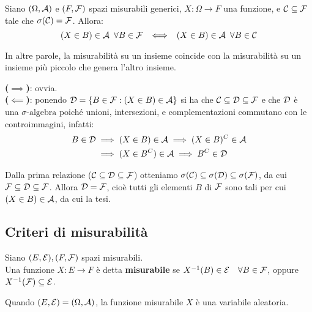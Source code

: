 \bigskip
\begin{teo}
  Siano $(\Omega, \mathcal A)$ e $(F, \mathcal F)$ spazi misurabili generici,
  $X: \Omega \to F$ una funzione, e $\mathcal C \subseteq \mathcal F$ tale che
  $\sigma(\mathcal C) = \mathcal F$. Allora:
  $$(X \in B) \in \mathcal A \enspace \forall B \in \mathcal F \enspace
    \iff \enspace (X \in B) \in \mathcal A \enspace \forall B \in \mathcal C$$
\end{teo}
In altre parole, la misurabilità su un insieme coincide con la misurabilità su un insieme più piccolo che genera l'altro insieme.

\begin{dimo}
  \textbf{($\implies$)}: ovvia. \\
  \textbf{($\impliedby$)}:
  ponendo $\mathcal D = \{ B \in \mathcal F: (X \in B) \in \mathcal A \}$ si ha che $\mathcal C \subseteq \mathcal D \subseteq \mathcal F$ e che $\mathcal D$ è una $\sigma\text{-algebra}$ poiché unioni, intersezioni, e complementazioni commutano con le controimmagini, infatti:
  \begin{align*}
    B \in \mathcal D &\implies (X \in B) \in \mathcal A
    \implies (X \in B)^C \in \mathcal A\\
    &\implies (X \in B^C) \in \mathcal A
    \implies B^C \in \mathcal D
  \end{align*}

  Dalla prima relazione ($\mathcal C \subseteq \mathcal D \subseteq \mathcal F$)
  otteniamo $\sigma(\mathcal C) \subseteq\sigma(\mathcal D) \subseteq \sigma(\mathcal F)$,
  da cui $\mathcal F \subseteq\mathcal D \subseteq \mathcal F$.
  Allora $\mathcal D = \mathcal F$, cioè tutti gli elementi $B$ di $\mathcal F$
  sono tali per cui $(X \in B) \in \mathcal A$, da cui la tesi. \qedhere

\end{dimo}

\subsection{Criteri di misurabilità}
\begin{defn}
  Siano $(E, \mathcal E), (F, \mathcal F)$ spazi misurabili. \\
  Una funzione $X: E \to F$ è detta \textbf{misurabile} se $X^{-1}(B) \in \mathcal E \quad \forall B \in \mathcal F$, oppure $X^{-1}(\mathcal F) \subseteq \mathcal E$.
\end{defn}
\begin{nb}
  Quando $(E,\mathcal E)=(\Omega, \mathcal A)$, la funzione misurabile $X$ è una variabile aleatoria.
\end{nb}

